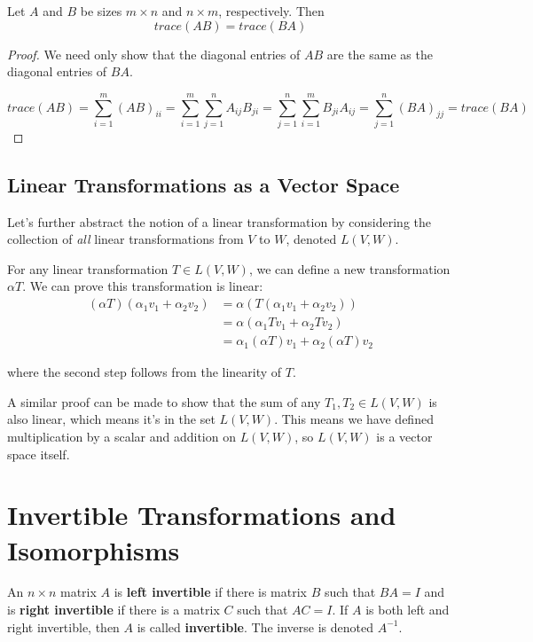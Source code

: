 \begin{theorem}
Let $A$ and $B$ be sizes $m \times n$ and $n \times m$, respectively. Then $$trace(AB) = trace(BA)$$
\end{theorem}

\begin{proof}
We need only show that the diagonal entries of $AB$ are the same as the diagonal entries of $BA$. 

$$trace(AB) = \sum_{i=1}^{m} (AB)_{ii} = \sum_{i=1}^{m} \sum_{j=1}^{n} A_{ij} B_{ji} = \sum_{j=1}^{n} \sum_{i=1}^{m} B_{ji} A_{ij} = \sum_{j=1}^{n} (BA)_{jj} = trace(BA)$$
\end{proof}

\subsection{Linear Transformations as a Vector Space}

Let's further abstract the notion of a linear transformation by considering the collection of \textit{all} linear transformations from $V$ to $W$, denoted $L(V, W)$. 

For any linear transformation $T \in L(V, W)$, we can define a new transformation $\alpha T$. We can prove this transformation is linear: 
$$
\begin{aligned} 
(\alpha T)(\alpha_{1} v_{1} + \alpha_{2} v_{2}) &= \alpha (T(\alpha_{1} v_{1} + \alpha_{2} v_{2})) \\
&= \alpha (\alpha_{1}Tv_{1} + \alpha_{2}Tv_{2}) \\
&= \alpha_{1} (\alpha T) v_{1} + \alpha_{2} (\alpha T) v_{2}
\end{aligned}
$$

where the second step follows from the linearity of $T$. 

A similar proof can be made to show that the sum of any $T_{1}, T_{2} \in L(V, W)$ is also linear, which means it's in the set $L(V, W)$. This means we have defined multiplication by a scalar and addition on $L(V, W)$, so $L(V, W)$ is a vector space itself. 

\section{Invertible Transformations and Isomorphisms}
\begin{definition}
An $n \times n$ matrix $A$ is \textbf{left invertible} if there is matrix $B$ such that $BA = I$ and is \textbf{right invertible} if there is a matrix $C$ such that $AC = I$. If $A$ is both left and right invertible, then $A$ is called \textbf{invertible}. The inverse is denoted $A^{-1}$. 
\end{definition}

